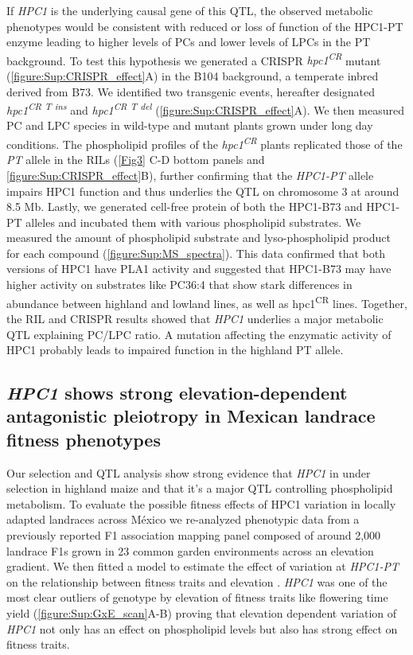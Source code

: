 \documentclass[9pt,twocolumn,twoside,lineno]{biorxiv}
\newcommand{\hpc}{\textit{HPC1}\xspace}
\begin{document}
If \hpc is the underlying causal gene of this QTL, the observed metabolic phenotypes would be consistent with reduced or loss of function of the HPC1-PT enzyme leading to higher levels of PCs and lower levels of LPCs in the PT background. 
To test this hypothesis we generated a CRISPR \textit{hpc1\textsuperscript{CR}} mutant (\cref{figure:Sup:CRISPR_effect}A) in the B104 background, a temperate inbred derived from B73. 
We identified two transgenic events, hereafter designated \textit{hpc1\textsuperscript{CR T ins}} and \textit{hpc1\textsuperscript{CR T del}} (\cref{figure:Sup:CRISPR_effect}A).
We then measured PC and LPC species in wild-type and mutant plants grown under long day conditions.  
The phospholipid profiles of the \textit{hpc1\textsuperscript{CR}} plants 
replicated those of the \textit{PT} allele in the RILs (\cref{Fig3} C-D bottom panels and \cref{figure:Sup:CRISPR_effect}B), further confirming that the \textit{HPC1-PT} allele impairs HPC1 function and thus underlies the QTL on chromosome 3 at around 8.5 Mb. 
Lastly, we generated cell-free protein of both the HPC1-B73 and HPC1-PT alleles and incubated them with various phospholipid substrates. 
We measured the amount of phospholipid substrate and lyso-phospholipid product for each compound (\cref{figure:Sup:MS_spectra}). 
This data confirmed that both versions of HPC1 have PLA1 activity and suggested that HPC1-B73 may have higher activity on substrates like PC36:4 that show stark differences in abundance between highland and lowland lines, as well as hpc1\textsuperscript{CR} lines.
Together, the RIL and CRISPR results showed that \hpc underlies a major metabolic QTL explaining PC/LPC ratio. 
A mutation affecting the enzymatic activity of HPC1 probably leads to impaired function in the highland PT allele.
\subsection{\hpc shows strong elevation-dependent antagonistic pleiotropy in Mexican landrace fitness phenotypes}
Our selection and QTL analysis show strong evidence that \hpc in under selection in highland maize and that it's a major QTL controlling phospholipid metabolism. 
To evaluate the possible fitness effects of HPC1 variation in locally adapted landraces across M\'exico we re-analyzed phenotypic data from a previously reported F1 association mapping panel \cite{Romero_Navarro2017-cn, Gates2019-xu} composed of around 2,000 landrace F1s grown in 23 common garden environments across an elevation gradient.  
We then fitted a model to estimate the effect of variation at \textit{HPC1-PT} on the relationship between fitness traits and elevation \cite{Runcie2019-Gr}.
\hpc was one of the most clear outliers of genotype by elevation of fitness traits like flowering time yield (\cref{figure:Sup:GxE_scan}A-B) proving that elevation dependent variation of \hpc not only has an effect on phospholipid levels but also has strong effect on fitness traits.
\end{document}
